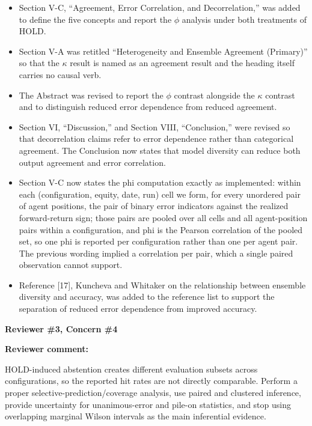\documentclass[11pt]{article}
\newcommand{\rvcomment}[1]{{\color{ReviewerGreen}#1}}
\newcommand{\concern}[1]{\textbf{\color{ReviewerGreen}#1}}
\begin{document}
\begin{itemize}

\item Section V-C, ``Agreement, Error Correlation, and Decorrelation,'' was added to define the five concepts and report the $\phi$ analysis under both treatments of HOLD.

\item Section V-A was retitled ``Heterogeneity and Ensemble Agreement (Primary)'' so that the $\kappa$ result is named as an agreement result and the heading itself carries no causal verb.

\item The Abstract was revised to report the $\phi$ contrast alongside the $\kappa$ contrast and to distinguish reduced error dependence from reduced agreement.

\item Section VI, ``Discussion,'' and Section VIII, ``Conclusion,'' were revised so that decorrelation claims refer to error dependence rather than categorical agreement. The Conclusion now states that model diversity can reduce both output agreement and error correlation.

\item Section V-C now states the phi computation exactly as implemented: within each (configuration, equity, date, run) cell we form, for every unordered pair of agent positions, the pair of binary error indicators against the realized forward-return sign; those pairs are pooled over all cells and all agent-position pairs within a configuration, and phi is the Pearson correlation of the pooled set, so one phi is reported per configuration rather than one per agent pair. The previous wording implied a correlation per pair, which a single paired observation cannot support.

\item Reference [17], Kuncheva and Whitaker on the relationship between ensemble diversity and accuracy, was added to the reference list to support the separation of reduced error dependence from improved accuracy.

\end{itemize}

\vspace{12pt}
\concern{Reviewer \#3, Concern \#4}

\concern{Reviewer comment:}

\rvcomment{HOLD-induced abstention creates different evaluation subsets across configurations, so the reported hit rates are not directly comparable. Perform a proper selective-prediction/coverage analysis, use paired and clustered inference, provide uncertainty for unanimous-error and pile-on statistics, and stop using overlapping marginal Wilson intervals as the main inferential evidence.}
\end{document}
